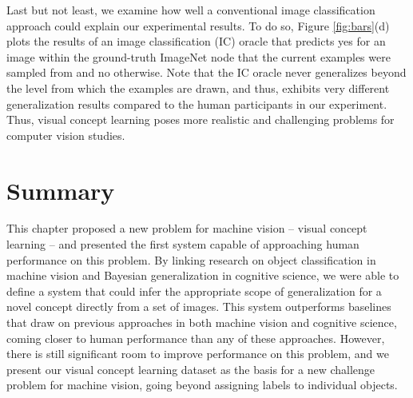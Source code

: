 Last but not least, we examine how well a conventional image classification approach could explain our experimental results. To do so, Figure \ref{fig:bars}(d) plots the results of an image classification (IC) oracle that predicts yes for an image within the ground-truth ImageNet node that the current examples were sampled from and no otherwise. Note that the IC oracle never generalizes beyond the level from which the examples are drawn, and thus, exhibits very different generalization results compared to the human participants in our experiment. Thus, visual concept learning poses more realistic and challenging problems for computer vision studies.

\section{Summary}

This chapter proposed a new problem for machine vision -- visual
concept learning -- and presented the first system capable of approaching
human performance on this problem. By linking research on object
classification in machine vision and Bayesian generalization in cognitive
science, we were able to define a system that could infer the appropriate
scope of generalization for a novel concept directly from a set of
images. This system outperforms baselines that draw on previous approaches
in both machine vision and cognitive science, coming closer to human
performance than any of these approaches. However, there is still
significant room to improve performance on this problem, and we present our
visual concept learning dataset as the basis for a new challenge problem
for machine vision, going beyond assigning labels to individual objects.
